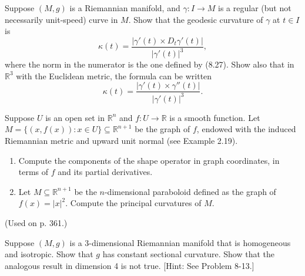 \begin{exercise}
\label{prob:geodesic-curvature-non-unit-speed-curve}

Suppose $(M, g)$ is a Riemannian manifold, and $\gamma: I \to M$ is a regular (but not necessarily unit-speed) curve in $M$. Show that the geodesic curvature of $\gamma$ at $t \in I$ is
\[
\kappa(t) = \frac{|\gamma'(t) \times D_t \gamma'(t)|}{|\gamma'(t)|^3},
\]
where the norm in the numerator is the one defined by (8.27). Show also that in $\mathbb{R}^3$ with the Euclidean metric, the formula can be written
\[
\kappa(t) = \frac{|\gamma'(t) \times \gamma''(t)|}{|\gamma'(t)|^3}.
\]
\end{exercise}

\begin{exercise}
\label{prob:graph-submanifold-shape}
Suppose $U$ is an open set in $\mathbb{R}^n$ and $f: U \to \mathbb{R}$ is a smooth function. Let $M = \{(x, f(x)) : x \in U\} \subseteq \mathbb{R}^{n+1}$ be the graph of $f$, endowed with the induced Riemannian metric and upward unit normal (see Example 2.19).

\begin{enumerate}
\item[(a)] Compute the components of the shape operator in graph coordinates, in terms of $f$ and its partial derivatives.
\item[(b)] Let $M \subseteq \mathbb{R}^{n+1}$ be the $n$-dimensional paraboloid defined as the graph of $f(x) = |x|^2$. Compute the principal curvatures of $M$.
\end{enumerate}

(Used on p. 361.)
\end{exercise}

\begin{exercise}
\label{prob:homogeneous-isotropic-3-manifold}
Suppose $(M, g)$ is a 3-dimensional Riemannian manifold that is homogeneous and isotropic. Show that $g$ has constant sectional curvature. Show that the analogous result in dimension 4 is not true. [Hint: See Problem 8-13.]
\end{exercise}

